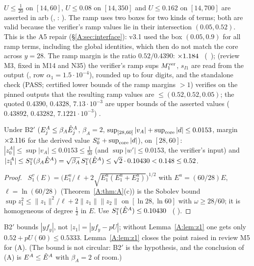 \documentclass[11pt]{article}
\begin{document}
$U\le\frac1{20}$ on $[14,60]$, $U\le0.08$ on $[14,350]$ and $U\le0.162$ on $[14,700]$ are asserted in arb (, : ). The ramp uses two boxes for two kinds of terms; both are valid because the verifier's ramp values lie in their intersection $(0.05,0.52)$. This is the A5 repair (\S\ref{A:sec:interface}): v3.1 used the box $(0.05,0.9)$ for all ramp terms, including the global identities, which then do not match the core across $y=28$. The ramp margin is the ratio $0.52/0.4390$: $\times1.184$ \tC\ (\SA\ ); (review M3, fixed in M14 and N35) the verifier's ramp sups $M_1^{\rm ver}$, $s_{I1}$ are read from the  output (, row $\alpha_1=1.5\cdot10^{-4}$), rounded up to four digits, and the standalone check  (PASS; certified lower bounds of the ramp margins $>1$) verifies on the pinned outputs that the resulting ramp values are $\le(0.52,0.52,0.05)$; the quoted $0.4390$, $0.4328$, $7.13\cdot10^{-3}$ are upper bounds of the asserted values ($0.43892$, $0.43282$, $7.1221\cdot10^{-3}$) \tC.

\begin{lemma}\label{A:lem:z1}
Under B2$'$ ($E^A_j\le\beta_A\hat E^A_j$, $\beta_A=2$, $\sup_{[28,60]}|v_A|+\sup_{\rm core}|d|\le0.0153$, margin $\times2.116$ for the derived value $S^v_0+\sup_{\rm core}|d|$), on $[28,60]$: $|z^A_0|\le\sup|v_A|\le0.0153\le\frac1{50}$ (and $\sup|w'|\le0.0153$, the verifier's input) and $|z^A_1|\le S^v_1(\beta_A\hat E^A)=\sqrt{\beta_A}\,S^v_1(\hat E^A)\le\sqrt2\cdot0.10430<0.148\le0.52$.
\end{lemma}
\begin{proof}\tP\ $S^v_1(E)=\bigl(E^u_1/\ell+2\sqrt{E^u_1(E^u_1+E^u_2)}\bigr)^{1/2}$ with $E^u=(60/28)E$, $\ell=\ln(60/28)$ (Theorem~\ref{A:thm:A}(c)) is the Sobolev bound $\sup z_1^2\le\|z_1\|^2/\ell+2\|z_1\|\|z_2\|$ on $[\ln28,\ln60]$ with $\omega\ge28/60$; it is homogeneous of degree $\frac12$ in $E$. Use $S^v_1(\hat E^A)\le0.10430$ \tC\ ( ).
\end{proof}
\noindent B2$'$ bounds $|yf_y|$, not $|z_1|=|yf_y-pU|$; without Lemma~\ref{A:lem:z1} one gets only $0.52+pU(60)\le0.5333$. Lemma~\ref{A:lem:z1} closes the point raised in review M5 for (A). (The bound is not circular: B2$'$ is the hypothesis, and the conclusion of (A) is $E^A\le\hat E^A$ with $\beta_A=2$ of room.)

\end{document}
